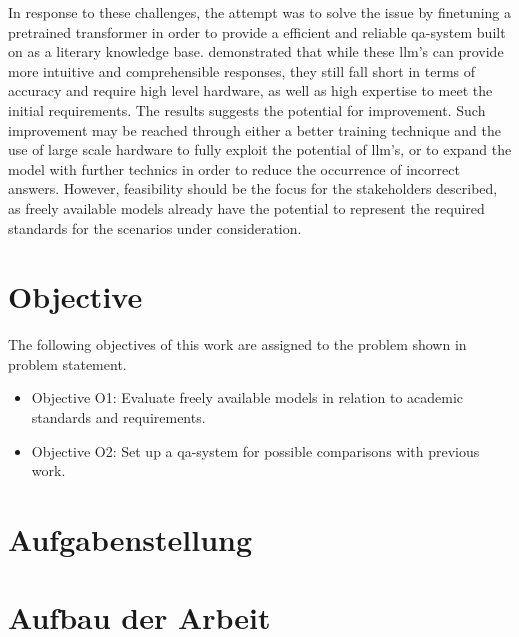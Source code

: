 In response to these challenges, the attempt was to solve the issue by finetuning a pretrained transformer in order to provide a efficient and reliable \ac{qa}-system built on \citet{bb2} as a literary knowledge base.
\citet{Paul_Keller} demonstrated that while these \ac{llm}'s can provide more intuitive and comprehensible responses, they still fall short in terms of accuracy and require high level hardware, as well as high expertise to meet the initial requirements. 
The results suggests the potential for improvement. 
Such improvement may be reached through either a better training technique and the use of large scale hardware to fully exploit the potential of \ac{llm}'s, or to expand the model with further technics in order to reduce the occurrence of incorrect answers.
%
However, feasibility should be the focus for the stakeholders described, as freely available models already have the potential to represent the required standards for the scenarios under consideration. 
 
\section{Objective}\label{objective}
The following objectives of this work are assigned to the problem shown in {problem statement}.
\begin{itemize}
  \item Objective O1: 
  Evaluate freely available models in relation to academic standards and requirements.
  \item Objective O2: 
  Set up a \ac{qa}-system for possible comparisons with previous work.
\end{itemize}
\section{Aufgabenstellung}



\section{Aufbau der Arbeit}
